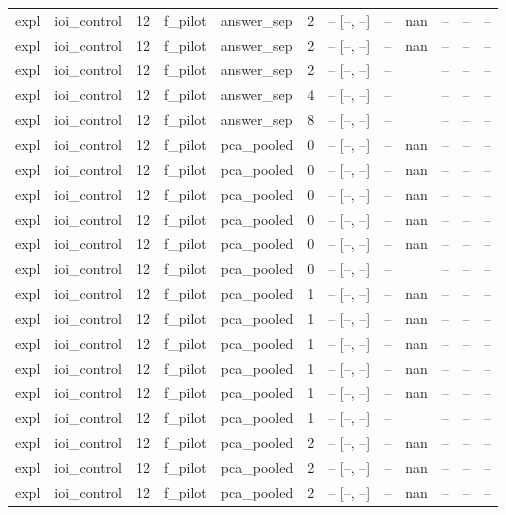 \begin{tabular}{llrllrrrlrrr}
expl & ioi\_control & 12 & f\_pilot & answer\_sep & 2 & -- [--, --] & -- & nan & -- & -- & -- \\
expl & ioi\_control & 12 & f\_pilot & answer\_sep & 2 & -- [--, --] & -- & nan & -- & -- & -- \\
expl & ioi\_control & 12 & f\_pilot & answer\_sep & 2 & -- [--, --] & -- &  & -- & -- & -- \\
expl & ioi\_control & 12 & f\_pilot & answer\_sep & 4 & -- [--, --] & -- &  & -- & -- & -- \\
expl & ioi\_control & 12 & f\_pilot & answer\_sep & 8 & -- [--, --] & -- &  & -- & -- & -- \\
expl & ioi\_control & 12 & f\_pilot & pca\_pooled & 0 & -- [--, --] & -- & nan & -- & -- & -- \\
expl & ioi\_control & 12 & f\_pilot & pca\_pooled & 0 & -- [--, --] & -- & nan & -- & -- & -- \\
expl & ioi\_control & 12 & f\_pilot & pca\_pooled & 0 & -- [--, --] & -- & nan & -- & -- & -- \\
expl & ioi\_control & 12 & f\_pilot & pca\_pooled & 0 & -- [--, --] & -- & nan & -- & -- & -- \\
expl & ioi\_control & 12 & f\_pilot & pca\_pooled & 0 & -- [--, --] & -- & nan & -- & -- & -- \\
expl & ioi\_control & 12 & f\_pilot & pca\_pooled & 0 & -- [--, --] & -- &  & -- & -- & -- \\
expl & ioi\_control & 12 & f\_pilot & pca\_pooled & 1 & -- [--, --] & -- & nan & -- & -- & -- \\
expl & ioi\_control & 12 & f\_pilot & pca\_pooled & 1 & -- [--, --] & -- & nan & -- & -- & -- \\
expl & ioi\_control & 12 & f\_pilot & pca\_pooled & 1 & -- [--, --] & -- & nan & -- & -- & -- \\
expl & ioi\_control & 12 & f\_pilot & pca\_pooled & 1 & -- [--, --] & -- & nan & -- & -- & -- \\
expl & ioi\_control & 12 & f\_pilot & pca\_pooled & 1 & -- [--, --] & -- & nan & -- & -- & -- \\
expl & ioi\_control & 12 & f\_pilot & pca\_pooled & 1 & -- [--, --] & -- &  & -- & -- & -- \\
expl & ioi\_control & 12 & f\_pilot & pca\_pooled & 2 & -- [--, --] & -- & nan & -- & -- & -- \\
expl & ioi\_control & 12 & f\_pilot & pca\_pooled & 2 & -- [--, --] & -- & nan & -- & -- & -- \\
expl & ioi\_control & 12 & f\_pilot & pca\_pooled & 2 & -- [--, --] & -- & nan & -- & -- & -- \\

\end{tabular}
